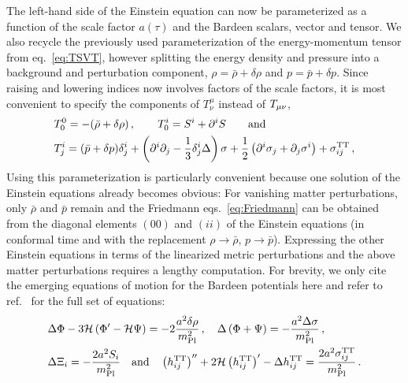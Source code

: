 The left-hand side of the Einstein equation can now be parameterized as a function of the scale factor $a(\tau)$ and the Bardeen scalars, vector and tensor. We also recycle the previously used parameterization of the energy-momentum tensor from eq.~\eqref{eq:TSVT}, however  splitting the energy density and pressure into a background and perturbation component, $\rho = \bar{\rho} + \delta \rho$ and $p = \bar{p} + \delta p$. Since raising and lowering indices now involves factors of the scale factors, it is most convenient to specify the components of $T^\mu_\nu$ instead of $T_{{\mu \nu}}$,
\begin{align}
	&T^0_0 = - (\bar{\rho} + \delta \rho) \, , \qquad T^i_0 = S^i + \partial^i S \qquad \text{and} \nonumber\\
	&T^i_j = (\bar{p} + \delta p) \delta^i_j  + \left( \partial^i \partial_j - \frac{1}{3} \delta^i_j \Delta \right) \sigma + \frac{1}{2} \left( \partial^i \sigma_j + \partial_j \sigma^i \right) + \sigma_{ij}^{\text{TT}} \, , \label{eq:TSVTFLRW}
\end{align}
Using this parameterization is particularly convenient because one solution of the Einstein equations already becomes obvious: For vanishing matter perturbations, only $\bar{\rho}$ and $\bar{p}$ remain and the Friedmann eqs.~\eqref{eq:Friedmann} can be obtained  from the diagonal elements $(00)$ and $(ii)$ of the Einstein equations (in conformal time and with the replacement $\rho \rightarrow \bar{\rho}$, $p \rightarrow \bar{p}$). Expressing the other Einstein equations in terms of the linearized metric perturbations and the above matter perturbations requires a lengthy computation. For brevity, we only cite the emerging equations of motion for the Bardeen potentials here and refer to ref.~\cite{Maggiore:2018sht} for the full set of equations:
\begin{align}
	&\Delta \Phi - 3 \mathcal{H} \left( \Phi^\prime - \mathcal{H} \Psi \right) = - 2 \frac{a^2 \delta \rho}{m_\text{Pl}^2} \, , \quad 
	\Delta \left( \Phi + \Psi \right) = - \frac{a^2 \Delta \sigma}{m_\text{Pl}^2} \, ,  \nonumber \\
	& \Delta \Xi_i = - \frac{2 a^2 S_i}{m_\text{Pl}^2} \quad \text{and} \quad
	\left( h_{ij}^{\text{TT}} \right)^{\prime\prime} + 2 \mathcal{H} \left( h_{ij}^{\text{TT}} \right)^{\prime} - \Delta h_{ij}^{\text{TT}} = \frac{2 a^2 \sigma_{ij}^{\text{TT}}}{m_\text{Pl}^2} \, . \label{eq:FLRWperturbation}
\end{align}
